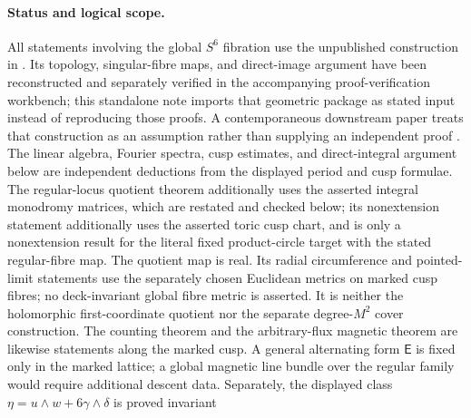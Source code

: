 \documentclass[11pt]{article}
\numberwithin{equation}{section}
\theoremstyle{definition}
\theoremstyle{remark}
\begin{document}
\begin{abstract}
By contrast, the specific degree-six magnetic construction pulled back from
the holomorphic first-coordinate elliptic quotient requires
$6\mu=a\tau+b$ for integers $a,b$.  We prove, from the stated transformation
and cusp laws, that this exceptional locus has no cusp-accumulating sequence
and is finite on the completed orbifold base.  Consequently that
first-coordinate Landau spectrum cannot supply the cusp limit.  Finally, all
fibre and finite Gaussian degenerations are distinguished from the scalar
Laplacian of any smooth metric on the compact total space, which necessarily
has compact resolvent and a positive first eigenvalue.
\end{abstract}

\paragraph{Status and logical scope.}
All statements involving the global $S^6$ fibration use the unpublished
construction in \citet{AlpogeS6_2026}.  Its topology, singular-fibre maps,
and direct-image argument have been reconstructed and separately verified in
the accompanying proof-verification workbench; this standalone note imports
that geometric package as stated input instead of reproducing those proofs.
A contemporaneous downstream paper treats
that construction as an assumption rather than supplying an independent
proof \citep{LiangLiuZhang_2026}.  The linear algebra, Fourier spectra, cusp
estimates, and direct-integral argument below are independent deductions
from the displayed period and cusp formulae.  The regular-locus quotient
theorem additionally uses the asserted integral monodromy matrices, which
are restated and checked below; its nonextension statement additionally uses
the asserted toric cusp chart, and is only a nonextension result for the
literal fixed product-circle target with the stated regular-fibre map.  The
quotient map is real.  Its radial
circumference and pointed-limit statements use the separately chosen
Euclidean metrics on marked cusp fibres; no deck-invariant global fibre
metric is asserted.  It is neither the holomorphic first-coordinate quotient
nor the separate degree-$M^2$ cover construction.
The counting theorem and the arbitrary-flux magnetic theorem are likewise
statements along the marked cusp.  A general alternating form $\mathsf E$ is
fixed only in the marked lattice; a global magnetic line bundle over the
regular family would require additional descent data.  Separately, the
displayed class $\eta=u\wedge w+6\gamma\wedge\delta$ is proved invariant
\end{document}
